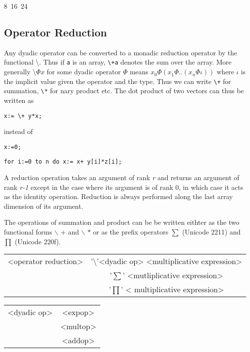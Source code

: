 {\begin{lyxcode}
8~16~24
\end{lyxcode}

\subsection{Operator Reduction}

Any dyadic operator can be converted to a monadic reduction
operator by the functional \textbackslash{}. Thus if \texttt{a} is an array,
\texttt{\textbackslash{}+a} denotes the sum over the array. More generally $ \setminus \Phi x $
for some dyadic operator $ \Phi  $ means $ x_{0}\Phi (x_{1}\Phi ..(x_{n}\Phi \iota )) $
where $ \iota  $ is the implicit value given the operator and the type. Thus
we can write \texttt{\textbackslash{}+} for summation, \texttt{\textbackslash{}{*}} for nary product
etc. The dot product of two vectors can thus be written as
\begin{verbatim}
x:= \+ y*x;
\end{verbatim} 

instead of

\texttt{x:=0;}

\texttt{for i:=0 to n do x:= x+ y{[}i{]}{*}z{[}i{]};}

A reduction operation takes an argument of rank \emph{r} and returns
an argument of rank \emph{r-1} except in the case where its argument is of rank
0, in which case it acts as the identity operation. Reduction is always performed
along the last array dimension of its argument. 

The operations of summation and product can be be written eithter as the two
functional forms $\backslash$ +
and $\backslash$ $ *$ or  as the prefix operators $\sum$ (Unicode 2211) and $\prod$ (Unicode 220f).




\vspace{0.3cm}
{\centering \begin{tabular}{|c|c|}
\hline 
<operator reduction>&
'\textbackslash{}'<dyadic op> <multiplicative expression>\\
& '$\sum$' <mutliplicative expression>\\
& '$\prod$' < multiplicative expression>\\
\hline 
\end{tabular}\par}
\vspace{0.3cm}

\vspace{0.3cm}
{\centering \begin{tabular}{|c|c|}
\hline 
<dyadic op>&
<expop>\\
&
<multop>\\
&
<addop>\\
\hline 
\end{tabular}\par}
\vspace{0.3cm}

}
